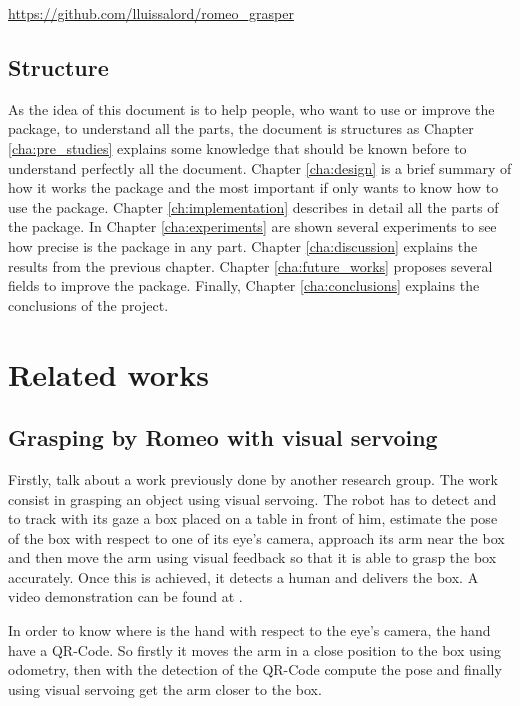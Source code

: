 \documentclass[12pt,a4paper,final,twoside,openright]{report}
\begin{document}
\url{https://github.com/lluissalord/romeo_grasper}

\vspace{-10pt}
\section{Structure}

\vspace{-5pt}
As the idea of this document is to help people, who want to use or improve the package, to understand all the parts, the document is structures as Chapter \ref{cha:pre_studies} explains some knowledge that should be known before to understand perfectly all the document. Chapter \ref{cha:design} is a brief summary of how it works the package and the most important if only wants to know how to use the package. Chapter \ref{ch:implementation} describes in detail all the parts of the package. In Chapter \ref{cha:experiments} are shown several experiments to see how precise is the package in any part. Chapter \ref{cha:discussion} explains the results from the previous chapter. Chapter \ref{cha:future_works} proposes several fields to improve the package. Finally, Chapter \ref{cha:conclusions} explains the conclusions of the project.

\chapter{Related works}

\section{Grasping by Romeo with visual servoing}
\label{sec:grasping_romeo_visual_servoing}

Firstly, talk about a work previously done by another research group. The work \cite{claudio:hal-01159882} consist in grasping an object using visual servoing. The robot has to detect and to track with its gaze a box placed on a table in front of him, estimate the pose of the box with respect to one of its eye's camera, approach its arm near the box and then move the arm using visual feedback so that it is able to grasp the box accurately. Once this is achieved, it detects a human and delivers the box. A video demonstration can be found at \cite{InriaLagadicgroup}.

In order to know where is the hand with respect to the eye's camera, the hand have a QR-Code. So firstly it moves the arm in a close position to the box using odometry, then with the detection of the QR-Code compute the pose and finally using visual servoing get the arm closer to the box.
\end{document}
